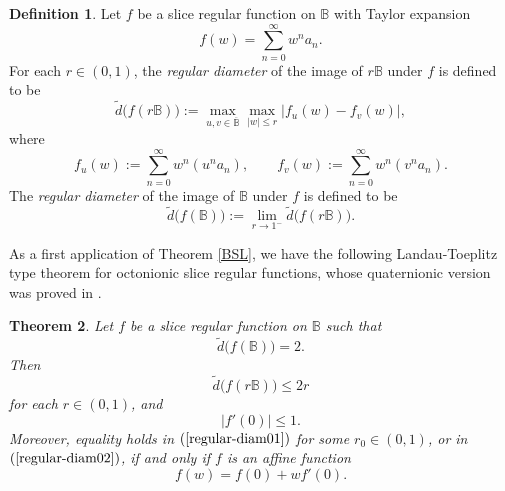 \documentclass{amsart}
\newtheorem{theorem}{Theorem}[section]
\theoremstyle{definition}
\newtheorem{definition}[theorem]{Definition}
\theoremstyle{remark}
\numberwithin{equation}{section}
\begin{document}
\begin{definition}
Let $f$ be a  slice  regular function on $\mathbb B$ with Taylor expansion
$$f(w)=\sum\limits_{n=0}^{\infty}w^na_n.$$ For each $r\in(0, 1)$, the \textit{regular diameter} of the image of $r\mathbb B$ under $f$ is defined to be
\begin{equation}\label{regular-diam}
\widetilde{d}\big(f(r\mathbb B)\big):=\max_{u,v\in \overline{\mathbb B}}\max_{|w|\leq r}|f_u(w)-f_v(w)|,
\end{equation}
where
$$f_u(w):=\sum\limits_{n=0}^{\infty}w^n(u^na_n), \qquad f_v(w):=\sum\limits_{n=0}^{\infty}w^n(v^na_n).$$
The \textit{regular diameter} of the image of $\mathbb B$ under $f$ is defined to be
\begin{equation}\label{regular-diam}
\widetilde{d}\big(f(\mathbb B)\big):=\lim_{r\rightarrow 1^-}\widetilde{d}\big(f(r\mathbb B)\big).
\end{equation}
\end{definition}

As a first application of Theorem \ref{BSL}, we have the following Landau-Toeplitz type theorem  for octonionic slice  regular functions, whose quaternionic version was proved in \cite{Gen-Sar}.
\begin{theorem}\label{regular diam-LT}
Let $f$ be a slice  regular function on $\mathbb B$ such that
$$\widetilde{d}\big(f(\mathbb B)\big)=2.$$
Then
\begin{equation}\label{regular-diam01}
\widetilde{d}\big(f(r\mathbb B)\big)\leq 2r
\end{equation}
for each $r\in(0, 1)$, and
\begin{equation}\label{regular-diam02}
 |f'(0)|\leq 1.
\end{equation}
Moreover, equality holds in $(\ref{regular-diam01})$ for some $r_0\in(0,1)$, or in $(\ref{regular-diam02})$, if and only if $f$ is an affine function
$$f(w)=f(0)+wf'(0).$$
\end{theorem}
\end{document}
